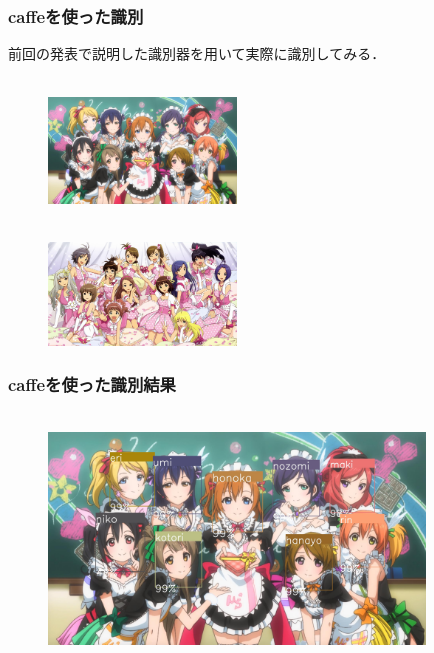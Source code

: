 \documentclass[dvipdfmx,11pt,notheorems]{beamer}
\theoremstyle{definition}
\begin{document}
\begin{frame}\frametitle{caffeを使った識別}
前回の発表で説明した識別器を用いて実際に識別してみる．

\begin{figure}[t]
 \begin{minipage}{0.45\hsize}
  \centering
   \\
  \centering
  \includegraphics[width=50mm]{./fig/jpg/lovelive.jpg} \\
 \end{minipage}
 \begin{minipage}{0.45\hsize}
  \centering
   \\
  \centering
  \includegraphics[width=50mm]{./fig/jpg/idolmaster.jpg}\\
 \end{minipage}
\end{figure}
\end{frame}

\begin{frame}\frametitle{caffeを使った識別結果}

\begin{figure}[t]
  \centering
   \\
  \centering
  \includegraphics[width=100mm]{./fig/jpg/result_lovelive.jpg} \\
\end{figure}
\end{frame}
\end{document}
